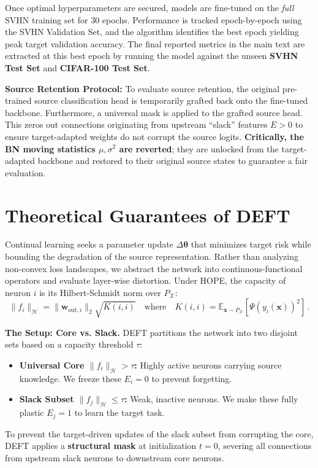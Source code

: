 \documentclass[11pt, a4paper, copyright, gdm]{google}
\newcommand{\wVect}{\boldsymbol{w}}
\newcommand{\xVect}{\boldsymbol{x}}
\newcommand{\thetaVect}{\boldsymbol{\theta}}
\newcommand{\calH}{\mathcal{H}}
\newcommand{\calX}{\mathcal{X}}
\newcommand{\E}{\mathbb{E}}
\theoremstyle{definition}
\begin{document}
Once optimal hyperparameters are secured, models are fine-tuned on the \textit{full} SVHN training set for $30$ epochs. Performance is tracked epoch-by-epoch using the SVHN Validation Set, and the algorithm identifies the best epoch yielding peak target validation accuracy. The final reported metrics in the main text are extracted at this best epoch by running the model against the unseen \textbf{SVHN Test Set} and \textbf{CIFAR-100 Test Set}.

\textbf{Source Retention Protocol:} To evaluate source retention, the original pre-trained source classification head is temporarily grafted back onto the fine-tuned backbone. Furthermore, a universal mask is applied to the grafted source head. This zeros out connections originating from upstream ``slack'' features $E > 0$ to ensure target-adapted weights do not corrupt the source logits. \textbf{Critically, the BN moving statistics $\mu,\sigma^2$ are reverted}; they are unlocked from the target-adapted backbone and restored to their original source states to guarantee a fair evaluation.

\section{Theoretical Guarantees of DEFT}
\label{app:theoretical_justification}

Continual learning seeks a parameter update $\Delta \thetaVect$ that minimizes target risk while bounding the degradation of the source representation. Rather than analyzing non-convex loss landscapes, we abstract the network into continuous-functional operators and evaluate layer-wise distortion. Under HOPE, the capacity of neuron $i$ is its Hilbert-Schmidt norm over $P_\calX$:
\begin{equation}
\label{eq:hope_capacity}
    \|f_i\|_{\calH} = \|\wVect_{\text{out},i}\|_2 \sqrt{K(i, i)} \quad \text{where} \quad K(i, i) = \E_{\xVect \sim P_{\calX}} \left[ \Psi(y_i(\xVect))^2 \right] \,.
\end{equation}

\textbf{The Setup: Core vs. Slack.}
DEFT partitions the network into two disjoint sets based on a capacity threshold $\tau$:
\begin{itemize}
    \item \textbf{Universal Core $\|f_i\|_{\calH} > \tau$:} Highly active neurons carrying source knowledge. We freeze these $E_i=0$ to prevent forgetting.
    \item \textbf{Slack Subset $\|f_j\|_{\calH} \le \tau$:} Weak, inactive neurons. We make these fully plastic $E_j=1$ to learn the target task.
\end{itemize}
To prevent the target-driven updates of the slack subset from corrupting the core, DEFT applies a \textbf{structural mask} at initialization $t=0$, severing all connections from upstream slack neurons to downstream core neurons.
\end{document}
